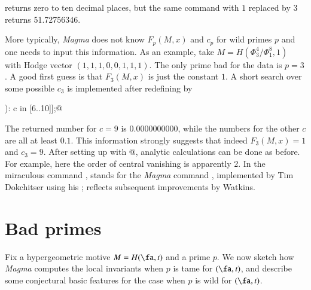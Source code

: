 \documentclass{notices}
\numberwithin{equation}{section}
\numberwithin{table}{section}
\numberwithin{figure}{section}
\begin{document}
{\noindent returns zero to ten decimal places, but the same command
with $1$ replaced by $3$ returns 51.72756346.


 More typically, {\em Magma} does not know $F_p(M,x)$ 
and $c_p$ for wild primes $p$ and one needs to input this information.
As an example, take 
 $M=H(\Phi_3^4/\Phi_1^8,1)$ with Hodge
 vector $(1,1,1,0,0,1,1,1)$.
 The only prime bad for the data is $p=3$.  
 A good first guess is that $F_3(M,x)$ is just the 
 constant $1$.      A short search over 
 some possible $c_3$ is implemented after redefining \verb@Q@ by
 \smallskip
 
 \verb@[CFENew(LSeries(Q,1:Precision:=10),@
 
 \verb@ BadPrimes:=[<3,c,1>]): c in [6..10]];@
 \smallskip
 
 \noindent The returned number for $c=9$ is $0.0000000000$, 
 while the numbers for the other $c$ are all at least $0.1$.  
 This information strongly suggests that indeed $F_3(M,x)=1$
 and $c_3=9$.   After setting up \verb@L@ with
 \verb@[<3,9,1>]@, analytic calculations can 
 be done as before.   For example, here 
 the order of central vanishing is apparently 2.  
 In the miraculous command \verb@CFENew@,
 \verb@CFE@ stands for the {\em Magma} command 
 \verb@CheckFunctionalEquation@, implemented
 by Tim Dokchitser using his \cite{Dok}; \verb@New@
 reflects subsequent improvements by Watkins.   

 
 

    
    


  
















\section{Bad primes}  
\label{bad} 
Fix a hypergeometric motive $M=H(\fa,t)$ and a prime $p$.  We now
sketch how {\em Magma} computes the local invariants 
when $p$ is tame for $(\fa,t)$, and describe some 
conjectural basic features for the case when $p$ is wild 
for $(\fa,t)$.  

}
\end{document}
